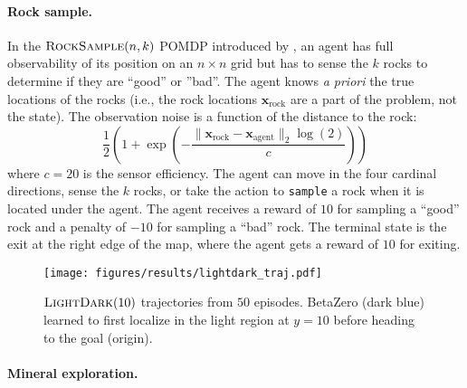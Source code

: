 \paragraph{Rock sample.}

In the $\textsc{RockSample}(n,k)$ POMDP introduced by \citeauthor{smith2012heuristic}, an agent has full observability of its position on an $n \times n$ grid but has to sense the $k$ rocks to determine if they are ``good'' or ''bad''.
The agent knows \textit{a priori} the true locations of the rocks (i.e., the rock locations $\mathbf{x}_\text{rock}$ are a part of the problem, not the state).
The observation noise is a function of the distance to the rock: %
\begin{equation}
   \frac{1}{2}\left(1 + \exp\left(-\frac{\lVert \mathbf{x}_\text{rock} - \mathbf{x}_\text{agent} \rVert_2 \log(2)}{c}\right)\right)
\end{equation}
where $c=20$ is the sensor efficiency.
The agent can move in the four cardinal directions, sense the $k$ rocks, or take the action to \texttt{sample} a rock when it is located under the agent.
The agent receives a reward of $10$ for sampling a ``good'' rock and a penalty of $-10$ for sampling a ``bad'' rock.
The terminal state is the exit at the right edge of the map, where the agent gets a reward of $10$ for exiting.


\begin{figure}[t!]
    \centering
    \texttt{[image: figures/results/lightdark\_traj.pdf]}
    \caption{$\textsc{LightDark}(10)$ trajectories from $50$ episodes.
    BetaZero (dark blue) learned to first localize in the light region at $y=10$ before heading to the goal (origin).}
    \label{fig:lightdark_trajectories}
\end{figure}


\paragraph{Mineral exploration.}

